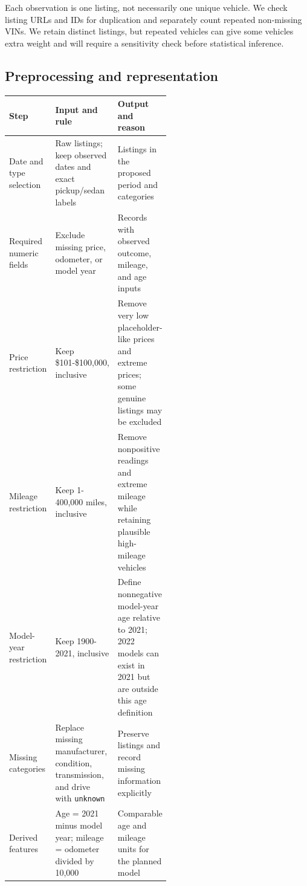 \documentclass[10pt,letterpaper]{article}
\begin{document}
Each observation is one listing, not necessarily one unique vehicle. We check listing URLs and IDs for duplication and separately count repeated non-missing VINs. We retain distinct listings, but repeated vehicles can give some vehicles extra weight and will require a sensitivity check before statistical inference.


\begin{minipage}{\linewidth}
\subsection*{Preprocessing and representation}
\begin{center}
\small
\renewcommand{\arraystretch}{1.18}
\begin{tabularx}{\linewidth}{@{}>{\raggedright\arraybackslash}p{0.19\linewidth}>{\raggedright\arraybackslash}p{0.34\linewidth}>{\raggedright\arraybackslash}X@{}}
\toprule
\textbf{Step} & \textbf{Input and rule} & \textbf{Output and reason} \\
\midrule
Date and type selection & Raw listings; keep observed dates and exact pickup/sedan labels & Listings in the proposed period and categories \\
Required numeric fields & Exclude missing price, odometer, or model year & Records with observed outcome, mileage, and age inputs \\
Price restriction & Keep \$101-\$100,000, inclusive & Remove very low placeholder-like prices and extreme prices; some genuine listings may be excluded \\
Mileage restriction & Keep 1-400,000 miles, inclusive & Remove nonpositive readings and extreme mileage while retaining plausible high-mileage vehicles \\
Model-year restriction & Keep 1900-2021, inclusive & Define nonnegative model-year age relative to 2021; 2022 models can exist in 2021 but are outside this age definition \\
Missing categories & Replace missing manufacturer, condition, transmission, and drive with \texttt{unknown} & Preserve listings and record missing information explicitly \\
Derived features & Age = 2021 minus model year; mileage = odometer divided by 10,000 & Comparable age and mileage units for the planned model \\
\bottomrule
\end{tabularx}
\end{center}
\end{minipage}
\end{document}

